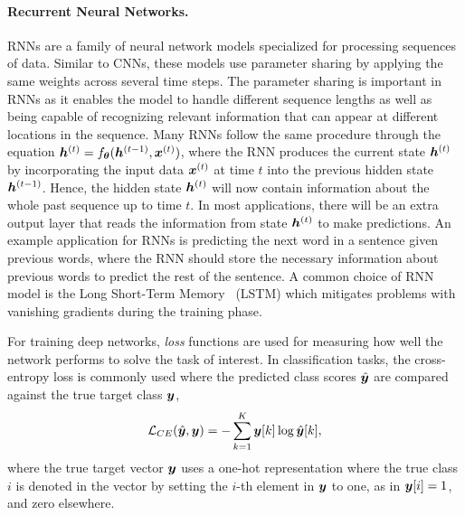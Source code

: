 


\paragraph{Recurrent Neural Networks.} RNNs are a family of neural network models specialized for processing sequences of data. Similar to CNNs, these models use parameter sharing by applying the same weights across several time steps. The parameter sharing is important in RNNs as it enables the model to handle different sequence lengths as well as being capable of recognizing relevant information that can appear at different locations in the sequence. Many RNNs follow the same procedure through the equation ${\bm{h}}^{(t)} = f_{{\bm{\theta}}}({\bm{h}}^{(t-1)}, {\bm{x}}^{(t)})$, where the RNN produces the current state ${\bm{h}}^{(t)}$ by incorporating the input data ${\bm{x}}^{(t)}$ at time $t$ into the previous hidden state ${\bm{h}}^{(t-1)}$. Hence, the hidden state ${\bm{h}}^{(t)}$ will now contain information about the whole past sequence up to time $t$. In most applications, there will be an extra output layer that reads the information from state ${\bm{h}}^{(t)}$ to make predictions. An example application for RNNs is predicting the next word in a sentence given previous words, where the RNN should store the necessary information about previous words to predict the rest of the sentence. A common choice of RNN model is the Long Short-Term Memory~\cite{hochreiter1997long} (LSTM) which mitigates problems with vanishing gradients during the training phase. \vspace{1mm}

For training deep networks, \textit{loss} functions are used for measuring how well the network performs to solve the task of interest. In classification tasks, the cross-entropy loss is commonly used where the predicted class scores $\hat{{\bm{y}}}$ are compared against the true target class ${\bm{y}}$,
\begin{align}
	{\mathcal{L}}_{CE}(\hat{{\bm{y}}}, {\bm{y}}) = -\sum_{k=1}^{K} {\bm{y}}[k] \log \hat{{\bm{y}}}[k],
\end{align}
where the true target vector ${\bm{y}}$ uses a one-hot representation where the true class $i$ is denoted in the vector by setting the $i$-th element in ${\bm{y}}$ to one, as in ${\bm{y}}[i] = 1$, and zero elsewhere. 

